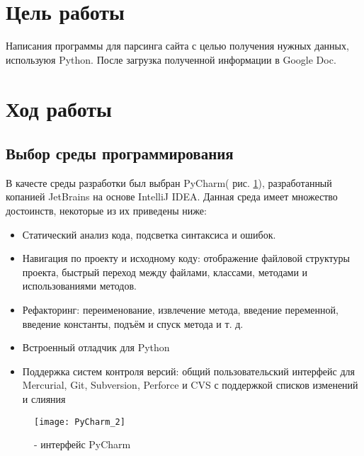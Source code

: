 







\section{Цель работы}
Написания программы для парсинга сайта с целью получения нужных данных, используюя Python. После загрузка полученной информации в Google Doc.

\section{Ход работы}

\subsection{Выбор среды программирования}
В качесте среды разработки был выбран PyCharm( рис. \ref{pic:pic_1}), разработанный копанией JetBrains на основе IntelliJ IDEA. Данная среда имеет множество достоинств, некоторые из их приведены ниже:

\begin{itemize}
	\item    Статический анализ кода, подсветка синтаксиса и ошибок.
	\item    Навигация по проекту и исходному коду: отображение файловой структуры проекта, быстрый переход между файлами, классами, методами и использованиями методов.
	\item    Рефакторинг: переименование, извлечение метода, введение переменной, введение константы, подъём и спуск метода и т. д.
	\item    Встроенный отладчик для Python
	\item    Поддержка систем контроля версий: общий пользовательский интерфейс для Mercurial, Git, Subversion, Perforce и CVS с поддержкой списков изменений и слияния
\end{itemize}
	
\begin{figure}[H]
	\begin{center}
		\texttt{[image: PyCharm\_2]}
		\caption{- интерфейс PyCharm} 
		\label{pic:pic_1} %
	\end{center}
\end{figure}


